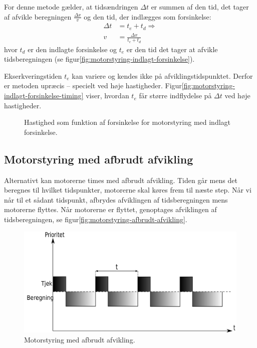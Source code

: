 For denne metode gælder, at tidsændringen $\Delta t$ er summen af den
tid, det tager af afvikle beregningen $\frac{\Delta x}v$ og den tid,
der indlægges som forsinkelse:
\begin{align}
  \Delta t &= t_e + t_d \Rightarrow \label{eq:afbrudt-afvikling-tid} \\
  v &= \frac{\Delta x}{t_e + t_d}
\end{align}
hvor $t_d$ er den indlagte forsinkelse og $t_e$ er den tid det tager
at afvikle tidsberegningen (se
figur\vref{fig:motorstyring-indlagt-forsinkelse}).

Ekserkveringstiden $t_e$ kan variere og kendes ikke på
afviklingstidspunktet. Derfor er metoden upræcis -- specielt ved høje
hastigheder. Figur\vref{fig:motorstyring-indlagt-forsinkelse-timing}
viser, hvordan $t_e$ får større indflydelse på $\Delta t$ ved høje
hastigheder.


\begin{figure}[htbp]
  \centering
  \vspace{3cm}
  \caption{Hastighed som funktion af forsinkelse for motorstyring med
    indlagt forsinkelse.}
  \label{fig:motorstyring-indlagt-forsinkelse-timing}
\end{figure}


\subsection{Motorstyring med afbrudt afvikling}

Alternativt kan motorerne times med afbrudt afvikling. Tiden går mens
det beregnes til hvilket tidspunkter, motorerne skal køres frem til
næste step. Når vi når til et sådant tidspunkt, afbrydes afviklingen
af tidsberegningen mens motorerne flyttes. Når motorerne er flyttet,
genoptages afviklingen af tidsberegningen, se
figur\vref{fig:motorstyring-afbrudt-afvikling}.

\begin{figure}[htbp]
  \centering
  \includegraphics[width=.8\textwidth]{../brugere/kjaergaard/motorstyring-afbrudt-afvikling}
  \caption{Motorstyring med afbrudt afvikling.}
  \label{fig:motorstyring-afbrudt-afvikling}
\end{figure}


